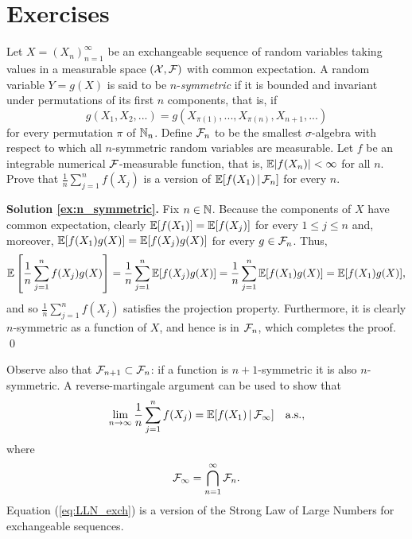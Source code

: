 

\section{Exercises}


\begin{exercise} \label{ex:n_symmetric}
	Let $X = (X_n)_{n=1}^{\infty}$ be an exchangeable sequence of random variables taking values in a measurable space $(\mathcal{X}, \mathcal{F})$ with common expectation. A random variable $Y = g(X)$ is said to be $n$-\textit{symmetric} if it is bounded and invariant under permutations of its first $n$ components, that is, if
	\begin{equation} \label{eq:n_symmetric}
		g(X_1, X_2, ...) = g(X_{\pi(1)}, ..., X_{\pi(n)}, X_{n+1}, ...)
	\end{equation}
	for every permutation $\pi$ of $\mathbb{N}_n$. Define $\mathcal{F}_n$ to be the smallest $\sigma$-algebra with respect to which all $n$-symmetric random variables are measurable. Let $f$ be an integrable numerical $\mathcal{F}$-measurable function, that is, $\mathbb{E} |f(X_n)| < \infty$ for all $n$. Prove that $\frac{1}{n} \sum_{j=1}^n f(X_j)$ is a version of $\mathbb{E}[ f(X_1) \, | \, \mathcal{F}_n ]$ for every $n$.
\end{exercise}

\textbf{Solution \ref{ex:n_symmetric}. \hspace{0.05cm}} Fix $n \in \mathbb{N}$. Because the components of $X$ have common expectation, clearly $\mathbb{E}[f(X_1)] = \mathbb{E}[f(X_j)]$ for every $1 \leq j \leq n$ and, moreover, $\mathbb{E}[ f(X_1) g(X) ] = \mathbb{E}[ f(X_j) g(X) ]$ for every $g \in \mathcal{F}_n$. Thus,
\begin{equation*}
	\mathbb{E} \left[ \frac{1}{n} \sum_{j=1}^n f(X_j) g(X) \right] = \frac{1}{n} \sum_{j=1}^n \mathbb{E}[ f(X_j) g(X) ] = \frac{1}{n} \sum_{j=1}^n \mathbb{E}[ f(X_1) g(X) ] = \mathbb{E}[ f(X_1) g(X) ],
\end{equation*}
and so $\frac{1}{n} \sum_{j=1}^n f(X_j)$ satisfies the projection property. Furthermore, it is clearly $n$-symmetric as a function of $X$, and hence is in $\mathcal{F}_n$, which completes the proof. \\
\qed

\vskip 0.25cm

Observe also that $\mathcal{F}_{n+1} \subset \mathcal{F}_n$: if a function is $n+1$-symmetric it is also $n$-symmetric. A reverse-martingale argument \cite[see Theorem B.124 (Lévy's theorem: part II) in][p.~650]{Schervish:1995} can be used to show that
\begin{equation} \label{eq:LLN_exch}
	\lim_{n \to \infty} \frac{1}{n} \sum_{j=1}^n f(X_j) = \mathbb{E}[ f(X_1) \, | \, \mathcal{F}_{\infty}] \quad \mathrm{a.s.}, 
\end{equation}
where
\begin{equation*}
	\mathcal{F}_{\infty} = \bigcap_{n=1}^{\infty} \mathcal{F}_n.
\end{equation*}
Equation (\ref{eq:LLN_exch}) is a version of the Strong Law of Large Numbers for exchangeable sequences.


